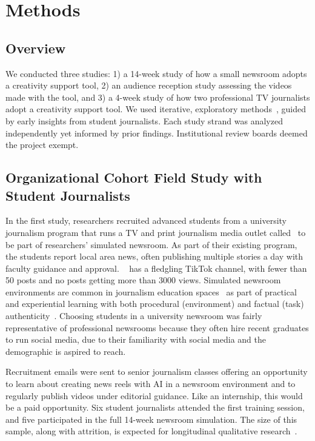 \section{Methods}
\subsection{Overview}
We conducted three studies:  
1) a 14-week study of how a small newsroom adopts a creativity support tool, 
2) an audience reception study assessing the videos made with the tool, and 
3) a 4-week study of how two professional TV journalists adopt a creativity support tool. 
We used iterative, exploratory methods~\cite{creswell2017designing}, guided by early insights from student journalists. Each study strand was analyzed independently yet informed by prior findings. Institutional review boards deemed the project exempt.


\subsection{Organizational Cohort Field Study with Student Journalists}
In the first study, researchers recruited advanced students from a university journalism program that runs a TV and print journalism media outlet called \nccnews~to be part of researchers' simulated newsroom. 
As part of their existing program, the students report local area news, often publishing multiple stories a day with faculty guidance and approval. 
\nccnews~ has a fledgling TikTok channel, with fewer than 50 posts and no posts getting more than 3000 views. 
Simulated newsroom environments are common in journalism education spaces~\cite{steel2007experiential} as part of practical and experiential learning with both procedural (environment) and factual (task) authenticity~\cite{chen2001pedagogy}.  
Choosing students in a university newsroom was fairly representative of professional newsrooms because they often hire recent graduates to run social media, due to their familiarity with social media and the demographic is aspired to reach.

Recruitment emails were sent to senior journalism classes offering an opportunity to learn about creating news reels with AI in a newsroom environment and to regularly publish videos under editorial guidance. 
Like an internship, this would be a paid opportunity.
Six student journalists attended the first training session, and five participated in the full 14-week newsroom simulation.  
The size of this sample, along with attrition, is expected for longitudinal qualitative research~\cite{saldana2003longitudinal}. 

